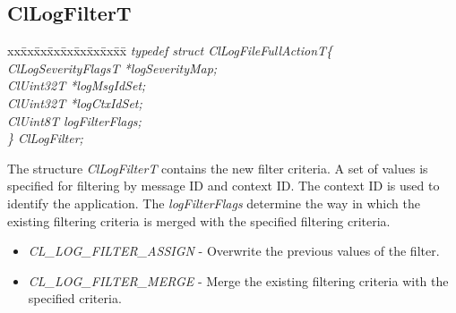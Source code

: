 \begin{flushleft}
\begin{itemize}
\subsection{ClLogFilterT}
\begin{tabbing}
xx\=xx\=xx\=xx\=xx\=xx\=xx\=xx\=xx\=\kill
\textit{typedef struct ClLogFileFullActionT\{}\\
\>\>\>\>\textit{ClLogSeverityFlagsT *logSeverityMap;}\\
\>\>\>\>\textit{ClUint32T                     *logMsgIdSet;}\\
\>\>\>\>\textit{ClUint32T                     *logCtxIdSet;}\\
\>\>\>\>\textit{ClUint8T                        logFilterFlags;}\\
\textit{\} ClLogFilter;}\end{tabbing}
The structure \textit{ClLogFilterT} contains the new filter criteria. A set of values is specified for filtering by message ID and context ID.
The context ID is used to identify the application. The \textit{logFilterFlags} determine the way in which the existing filtering criteria is merged
with the specified filtering criteria.
\begin{itemize}
\item
\textit{CL\_\-LOG\_\-FILTER\_\-ASSIGN} - Overwrite the previous values of the filter.
\item
\textit{CL\_\-LOG\_\-FILTER\_\-MERGE} - Merge the existing filtering criteria with the specified criteria.
\end{itemize}




\end{itemize}
\end{flushleft}
